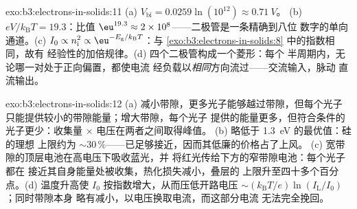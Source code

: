 \begin{solution}{exo:b3:electrons-in-solids:11}
(a) $V_{\text{bi}} = 0.0259\ln(10^{12}) \approx \qty{0.71}{V}$。
(b) $eV/k_{\text{B}}T = 19.3$：比值 $\eu^{19.3} \approx
2\times10^{8}$——二极管是一条精确到八位
数字的单向通道。(c) $I_0 \propto n_{\text{i}}^2 \propto
\eu^{-E_{\text{g}}/k_{\text{B}}T}$：与
\cref{exo:b3:electrons-in-solids:8} 中的指数相同，故有
经验性的加倍规律。(d) 四个二极管构成一个菱形：每个
半周期内，无论哪一对处于正向偏置，都使电流
经负载以\emph{相同}方向流过——交流输入，脉动
直流输出。
\end{solution}

\begin{solution}{exo:b3:electrons-in-solids:12}
(a) 减小带隙，更多光子能够越过带隙，但每个光子
只能提供较小的带隙能量；增大带隙，每个光子
提供的能量更多，但符合条件的光子更少：收集量 $\times$ 电压在两者之间取得峰值。
(b) 略低于 \qty{1.3}{eV} 的最优值：硅的理想
上限约为 $\sim30\,\%$——已足够接近，因而其低廉的价格占了上风。
(c) 宽带隙的顶层电池在高电压下吸收蓝光，并
将红光传给下方的窄带隙电池：每个光子都在
接近其自身能量处被收集，热化损失减小，叠层的
上限升至四十多个百分点。(d) 温度升高使 $I_0$
按指数增大，从而压低开路电压
$\sim(k_{\text{B}}T/e)\ln(I_{\text{L}}/I_0)$；同时带隙本身
略有减小，以电压换取电流，而这部分电流
无法完全挽回。
\end{solution}


